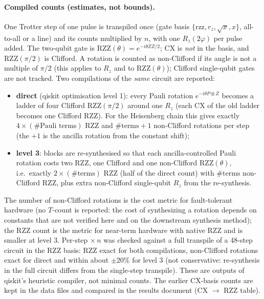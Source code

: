 \documentclass[11pt]{article}
\theoremstyle{definition}
\begin{document}
\paragraph{Compiled counts (estimates, not bounds).} One Trotter step of one pulse is transpiled once (gate basis $\{\mathrm{rzz},r_z,\sqrt{x},x\}$, all-to-all or a line)
and its counts multiplied by $n$, with one $R_z(2\varphi)$ per pulse added. The two-qubit gate is $\mathrm{RZZ}(\theta)=e^{-i\theta ZZ/2}$; CX is \emph{not} in the basis, and
$\mathrm{RZZ}(\pi/2)$ is Clifford. A rotation is counted as non-Clifford if its angle is not a multiple of $\pi/2$ (this applies to $R_z$ and to $\mathrm{RZZ}(\theta)$);
Clifford single-qubit gates are not tracked. Two compilations of the \emph{same} circuit are reported:
\begin{itemize}[leftmargin=*]
\item \textbf{direct} (qiskit optimisation level 1): every Pauli rotation $e^{-i\theta P\otimes Z}$ becomes a ladder of four Clifford $\mathrm{RZZ}(\pi/2)$ around one $R_z$ (each CX of the
 old ladder becomes one Clifford RZZ). For the Heisenberg chain this gives exactly $4\times(\#\text{Pauli terms})$ RZZ and $\#\text{terms}+1$ non-Clifford rotations per step (the $+1$ is the
 ancilla rotation from the constant shift);
\item \textbf{level 3}: blocks are re-synthesised so that each ancilla-controlled Pauli rotation costs two RZZ, one Clifford and one non-Clifford $\mathrm{RZZ}(\theta)$,
 i.e.\ exactly $2\times(\#\text{terms})$ RZZ (half of the direct count) with $\#\text{terms}$ non-Clifford RZZ, plus extra non-Clifford single-qubit $R_z$ from the re-synthesis.
\end{itemize}
The number of non-Clifford rotations is the cost metric for fault-tolerant hardware (no $T$-count is reported: the cost of synthesizing a rotation depends on constants that are not verified here and on
the downstream synthesis method); the RZZ count is the metric for near-term hardware with native RZZ and is smaller at level 3. Per-step $\times\,n$ was checked against a full
transpile of a 48-step circuit in the RZZ basis: RZZ exact for both compilations, non-Clifford rotations exact for direct and within about $\pm20\%$ for level 3 (not conservative: re-synthesis in the full circuit differs from the single-step transpile). These are outputs of qiskit's
heuristic compiler, not minimal counts. The earlier CX-basis counts are kept in the data files and compared in the results document (CX $\to$ RZZ table).
\end{document}
